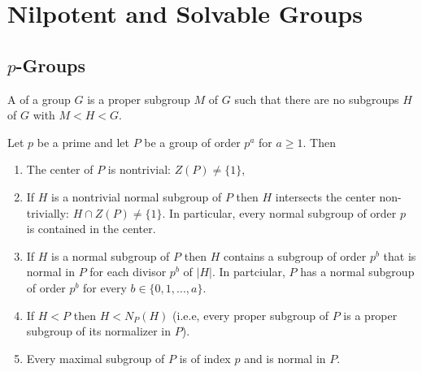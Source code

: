 \documentclass[12pt, a4paper, twoside, openright, titlepage]{book}
\begin{document}
\chapter{\textsection\textsection Nilpotent and Solvable Groups}

\section{\textsection $p$-Groups}

\begin{defn}{}{}
    A  of a group $G$ is a proper subgroup $M$ of $G$ such that there are no subgroups $H$ of $G$ with $M < H < G$.
\end{defn}


\begin{thm}{}{}
    Let $p$ be a prime and let $P$ be a group of order $p^a$ for $a \geq 1$. Then \begin{enumerate}
        \item The center of $P$ is nontrivial: $Z(P) \neq \{1\}$,
        \item If $H$ is a nontrivial normal subgroup of $P$ then $H$ intersects the center non-trivially: $H \cap Z(P) \neq \{1\}$. In particular, every normal subgroup of order $p$ is contained in the center.
        \item If $H$ is a normal subgroup of $P$ then $H$ contains a subgroup of order $p^b$ that is normal in $P$ for each divisor $p^b$ of $|H|$. In partciular, $P$ has a normal subgroup of order $p^b$ for every $b \in \{0,1,...,a\}$.
        \item If $H < P$ then $H < N_P(H)$ (i.e.e, every proper subgroup of $P$ is a proper subgroup of its normalizer in $P$).
        \item Every maximal subgroup of $P$ is of index $p$ and is normal in $P$.
    \end{enumerate}
\end{thm}
\end{document}
